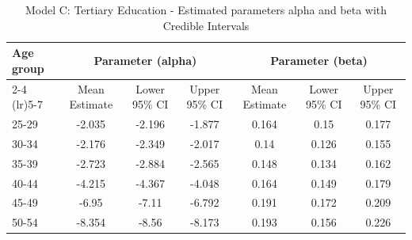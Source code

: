 \begin{landscape}
\begin{table}[htbp]
\centering
\caption{Model C: Tertiary Education - Estimated parameters alpha and beta  with Credible Intervals}
\label{tab:Fparameters_ab12}
\begin{tabular}{@{}lcccccc@{}}
\toprule
Age group & \multicolumn{3}{c}{Parameter (alpha)} & \multicolumn{3}{c}{Parameter (beta)} \\ 
\cmidrule(lr){2-4} \cmidrule(lr){5-7}
          & Mean Estimate & Lower 95\% CI & Upper 95\% CI & Mean Estimate & Lower 95\% CI & Upper 95\% CI \\ 
\midrule
25-29 & -2.035 & -2.196 & -1.877 & 0.164 & 0.15 & 0.177 \\
30-34 & -2.176 & -2.349 & -2.017 & 0.14 & 0.126 & 0.155 \\
35-39 & -2.723 & -2.884 & -2.565 & 0.148 & 0.134 & 0.162 \\
40-44 & -4.215 & -4.367 & -4.048 & 0.164 & 0.149 & 0.179 \\
45-49 & -6.95 & -7.11 & -6.792 & 0.191 & 0.172 & 0.209 \\
50-54 & -8.354 & -8.56 & -8.173 & 0.193 & 0.156 & 0.226 \\
\bottomrule
\end{tabular}
\end{table}
\end{landscape}